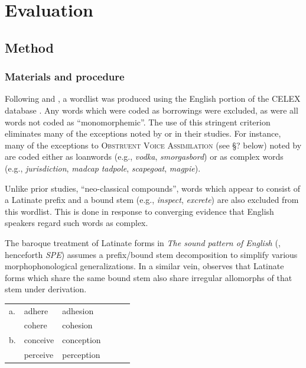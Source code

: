 \section{Evaluation}
\label{4evaluation}

\subsection{Method}

\subsubsection{Materials and procedure}

Following \citet[ chap.~8]{Duanmu2009} and \citet[ chap.~3]{Hammond1999a}, 
a wordlist was produced using the English portion of the CELEX database \citep{CELEX}. Any words which were coded as borrowings were excluded, as were all words not coded as ``monomorphemic''. The use of this stringent criterion eliminates many of the exceptions noted by \citeauthor{Duanmu2009} or \citeauthor{Hammond1999a} in their studies. For instance, many of the exceptions to \textsc{Obstruent Voice Assimilation} (see \S? below) noted by \citet[74]{Hammond1999a} are coded either as loanwords (e.g., \emph{vodka}, \emph{smorgasbord}) or as complex words (e.g., \emph{jurisdiction}, \emph{madcap} \emph{tadpole}, \emph{scapegoat}, \emph{magpie}). 

Unlike prior studies, ``neo-classical compounds'', words which appear to consist of a Latinate prefix and a bound stem (e.g., \emph{inspect}, \emph{excrete}) are also excluded from this wordlist. This is done in response to converging evidence that English speakers regard such words as complex. 

The baroque treatment of Latinate forms in \emph{The sound pattern of English} (\citealp{SPE}, henceforth \emph{SPE}) assumes a prefix/bound stem decomposition to simplify various morphophonological generalizations. In a similar vein, \citet[11f.]{Aronoff1976} observes that Latinate forms which share the same bound stem also share irregular allomorphs of that stem under derivation. 

\begin{example}
\begin{tabular}{l l l l l l}
a. & {adhere}   & {adhesion}   \\
   & {cohere}   & {cohesion}   \\
b. & {conceive} & {conception} \\
   & {perceive} & {perception} \\
\end{tabular}
\end{example}

